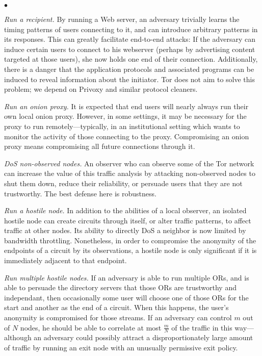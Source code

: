 \documentclass[times,10pt,twocolumn]{article}
\newenvironment{tightlist}{\begin{list}{$\bullet$}{
  \setlength{\itemsep}{0mm}
    \setlength{\parsep}{0mm}
    }}{\end{list}}
\begin{document}
\begin{tightlist}
\item \emph{Run a recipient.} By running a Web server, an adversary
  trivially learns the timing patterns of users connecting to it, and
  can introduce arbitrary patterns in its responses.  This can greatly
  facilitate end-to-end attacks: If the adversary can induce certain
  users to connect to his webserver (perhaps by advertising
  content targeted at those users), she now holds one end of their
  connection.  Additionally, there is a danger that the application
  protocols and associated programs can be induced to reveal
  information about the initiator. Tor does not aim to solve this problem;
  we depend on Privoxy and similar protocol cleaners.
  
\item \emph{Run an onion proxy.} It is expected that end users will
  nearly always run their own local onion proxy. However, in some
  settings, it may be necessary for the proxy to run
  remotely---typically, in an institutional setting which wants
  to monitor the activity of those connecting to the proxy.
  Compromising an onion proxy means compromising all future connections
  through it.

\item \emph{DoS non-observed nodes.} An observer who can observe some
  of the Tor network can increase the value of this traffic analysis
  by attacking non-observed nodes to shut them down, reduce
  their reliability, or persuade users that they are not trustworthy.
  The best defense here is robustness.
  
\item \emph{Run a hostile node.}  In addition to the abilities of a
  local observer, an isolated hostile node can create circuits through
  itself, or alter traffic patterns, to affect traffic at
  other nodes. Its ability to directly DoS a neighbor is now limited
  by bandwidth throttling. Nonetheless, in order to compromise the
  anonymity of the endpoints of a circuit by its observations, a
  hostile node is only significant if it is immediately adjacent to
  that endpoint. 
  
\item \emph{Run multiple hostile nodes.}  If an adversary is able to
  run multiple ORs, and is able to persuade the directory servers
  that those ORs are trustworthy and independant, then occasionally
  some user will choose one of those ORs for the start and another
  as the end of a circuit.  When this happens, the user's
  anonymity is compromised for those streams.  If an adversary can
  control $m$ out of $N$ nodes, he should be able to correlate at most 
  $\frac{m}{N}$ of the traffic in this way---although an adversary
  could possibly attract a disproportionately large amount of traffic
  by running an exit node with an unusually permissive exit policy.


\end{tightlist}
\end{document}
